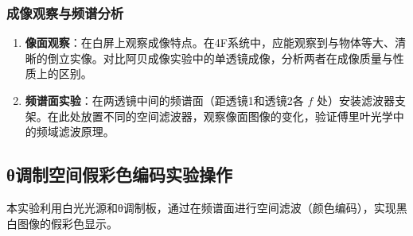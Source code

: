 \documentclass[11pt]{article}
\begin{document}
\subsubsection{成像观察与频谱分析}
\begin{enumerate}
    \item \textbf{像面观察}：在白屏上观察成像特点。在4F系统中，应能观察到与物体等大、清晰的倒立实像。对比阿贝成像实验中的单透镜成像，分析两者在成像质量与性质上的区别。
    \item \textbf{频谱面实验}：在两透镜中间的频谱面（距透镜1和透镜2各 $f$ 处）安装滤波器支架。在此处放置不同的空间滤波器，观察像面图像的变化，验证傅里叶光学中的频域滤波原理。
\end{enumerate}

\subsection{θ调制空间假彩色编码实验操作}

本实验利用白光光源和θ调制板，通过在频谱面进行空间滤波（颜色编码），实现黑白图像的假彩色显示。
\end{document}
